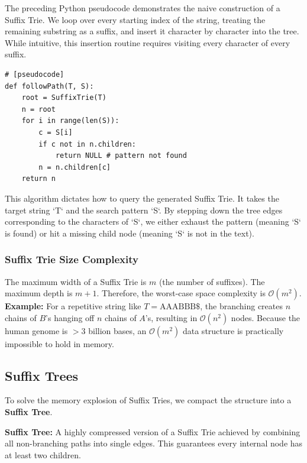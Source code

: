 \documentclass[11pt,a4paper]{article}
\newenvironment{important}{%
    \begin{tcolorbox}[colback=blue!5, colframe=blue!80!black, arc=4mm, boxrule=1pt]
}{%
    \end{tcolorbox}
}
\begin{document}
The preceding Python pseudocode demonstrates the naive construction of a Suffix Trie. We loop over every starting index of the string, treating the remaining substring as a suffix, and insert it character by character into the tree. While intuitive, this insertion routine requires visiting every character of every suffix.

\begin{verbatim}
# [pseudocode]
def followPath(T, S):
    root = SuffixTrie(T)
    n = root
    for i in range(len(S)):
        c = S[i]
        if c not in n.children:
            return NULL # pattern not found
        n = n.children[c]
    return n
\end{verbatim}

This algorithm dictates how to query the generated Suffix Trie. It takes the target string `T` and the search pattern `S`. By stepping down the tree edges corresponding to the characters of `S`, we either exhaust the pattern (meaning `S` is found) or hit a missing child node (meaning `S` is not in the text).

\subsubsection{Suffix Trie Size Complexity}
The maximum width of a Suffix Trie is $m$ (the number of suffixes). The maximum depth is $m+1$. Therefore, the worst-case space complexity is $\mathcal{O}(m^2)$.
\textbf{Example:} For a repetitive string like $T = \text{AAABBB\$}$, the branching creates $n$ chains of $B$'s hanging off $n$ chains of $A$'s, resulting in $\mathcal{O}(n^2)$ nodes.
Because the human genome is $>3$ billion bases, an $\mathcal{O}(m^2)$ data structure is practically impossible to hold in memory.

\subsection{Suffix Trees}
To solve the memory explosion of Suffix Tries, we compact the structure into a \textbf{Suffix Tree}.

\begin{important}
    \textbf{Suffix Tree:} A highly compressed version of a Suffix Trie achieved by combining all non-branching paths into single edges. This guarantees every internal node has at least two children.
\end{important}

\end{document}
